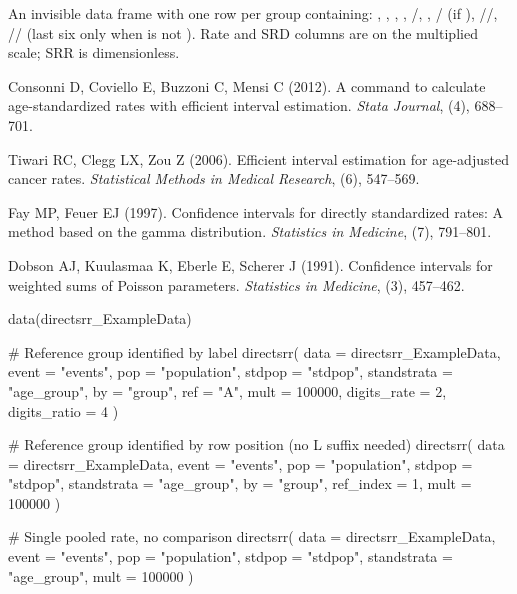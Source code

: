 \documentclass[a4paper]{book}
\begin{document}
%
\begin{Value}
An invisible data frame with one row per group containing:
, , , ,
/, ,
/ (if ),
//,
//
(last six only when  is not ).
Rate and SRD columns are on the multiplied scale; SRR is dimensionless.
\end{Value}
%
\begin{References}
Consonni D, Coviello E, Buzzoni C, Mensi C (2012). A command to calculate
age-standardized rates with efficient interval estimation.
\emph{Stata Journal}, (4), 688--701.

Tiwari RC, Clegg LX, Zou Z (2006). Efficient interval estimation for
age-adjusted cancer rates. \emph{Statistical Methods in Medical Research},
(6), 547--569. 

Fay MP, Feuer EJ (1997). Confidence intervals for directly standardized
rates: A method based on the gamma distribution.
\emph{Statistics in Medicine}, (7), 791--801.

Dobson AJ, Kuulasmaa K, Eberle E, Scherer J (1991). Confidence intervals
for weighted sums of Poisson parameters.
\emph{Statistics in Medicine}, (3), 457--462.
\end{References}
%
\begin{Examples}
\begin{ExampleCode}
data(directsrr_ExampleData)

# Reference group identified by label
directsrr(
  data        = directsrr_ExampleData,
  event       = "events",
  pop         = "population",
  stdpop      = "stdpop",
  standstrata = "age_group",
  by          = "group",
  ref         = "A",
  mult        = 100000,
  digits_rate  = 2,
  digits_ratio = 4
)

# Reference group identified by row position (no L suffix needed)
directsrr(
  data        = directsrr_ExampleData,
  event       = "events",
  pop         = "population",
  stdpop      = "stdpop",
  standstrata = "age_group",
  by          = "group",
  ref_index   = 1,
  mult        = 100000
)

# Single pooled rate, no comparison
directsrr(
  data        = directsrr_ExampleData,
  event       = "events",
  pop         = "population",
  stdpop      = "stdpop",
  standstrata = "age_group",
  mult        = 100000
)

\end{ExampleCode}
\end{Examples}
\end{document}
